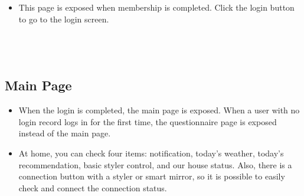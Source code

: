 \documentclass[conference]{IEEEtran}
\begin{document}
\begin{enumerate}
        \begin{itemize}
        \item[] This page is exposed when membership is completed. Click the login button to go to the login screen. \\ \\ \\ \\
    \end{itemize}
    \end{enumerate}

\subsection{Main Page}
\begin{itemize}
    \item[] When the login is completed, the main page is exposed. When a user with no login record logs in for the first time, the questionnaire page is exposed instead of the main page.
    \item[] At home, you can check four items: notification, today's weather, today's recommendation, basic styler control, and our house status. Also, there is a connection button with a styler or smart mirror, so it is possible to easily check and connect the connection status.\\  \\ \\ \\ \\ \\ \\
\end{itemize}
\end{document}
